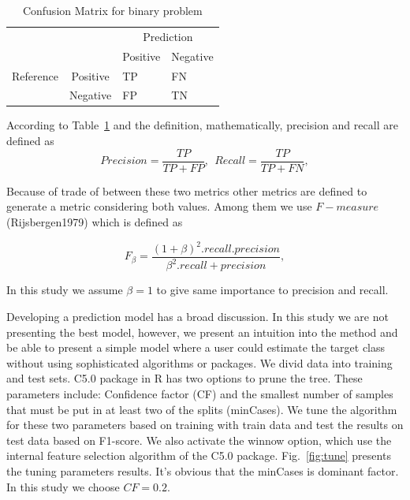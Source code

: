 \begin{table}
\centering
\caption{Confusion Matrix for binary problem}
\label{my-label}
\begin{tabular}{llll}
\hline
                                                 &                              & \multicolumn{2}{c}{Prediction}                              \\ \cline{3-4} 
                                                 &                              & \multicolumn{1}{c}{Positive} & \multicolumn{1}{c}{Negative} \\ \cline{2-4} 
\multicolumn{1}{c}{Reference} & \multicolumn{1}{c}{Positive} & TP                           & FN                           \\
\multicolumn{1}{c}{}                             & \multicolumn{1}{c}{Negative} & FP                           & TN                           \\ \hline
\end{tabular}
\label{tab:confusion_def}
\end{table}

According to Table~\ref{tab:confusion_def} and the definition, mathematically, precision and recall are defined as
\begin{equation}
Precision = \frac{TP}{TP+FP}, ~ ~ Recall = \frac{TP}{TP+FN},
\end{equation}

Because of trade of between these two metrics other metrics are defined to generate a metric considering both values. Among them we use $F-measure$ (Rijsbergen1979) which is defined as 

\begin{equation}
F_\beta = \frac{(1+\beta)^2.recall.precision}{\beta^2.recall+precision},
\end{equation}

In this study we assume $\beta = 1$ to give same importance to precision and recall.

Developing a prediction model has a broad discussion. In this study we are not presenting the best model, however, we present an intuition into the method and be able to present a simple model where a user could estimate the target class without using sophisticated algorithms or packages. We divid data into training and test sets. C5.0 package in R has two options to prune the tree. These parameters include: Confidence factor (CF) and the smallest number of samples that must be put in at least two of the splits (minCases). We tune the algorithm for these two parameters based on training with train data and test the results on test data based on F1-score. We also activate the winnow option, which use the internal feature selection algorithm of the C5.0 package. Fig.~\ref{fig:tune} presents the tuning parameters results. It's obvious that the minCases is dominant factor. In this study we choose $CF=0.2$. 

